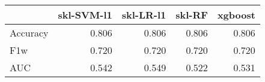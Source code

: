 \begin{tabular}{lrrrr}
\toprule
{} &  skl-SVM-l1 &  skl-LR-l1 &  skl-RF &  xgboost \\
\midrule
Accuracy &       0.806 &      0.806 &   0.806 &    0.806 \\
F1w      &       0.720 &      0.720 &   0.720 &    0.720 \\
AUC      &       0.542 &      0.549 &   0.522 &    0.531 \\
\bottomrule
\end{tabular}
